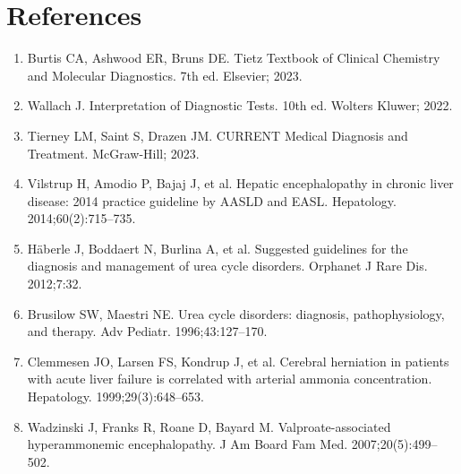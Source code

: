\section*{References}
\begin{enumerate}
  \item Burtis CA, Ashwood ER, Bruns DE. Tietz Textbook of Clinical Chemistry and Molecular Diagnostics. 7th ed. Elsevier; 2023.
  \item Wallach J. Interpretation of Diagnostic Tests. 10th ed. Wolters Kluwer; 2022.
  \item Tierney LM, Saint S, Drazen JM. CURRENT Medical Diagnosis and Treatment. McGraw-Hill; 2023.
  \item Vilstrup H, Amodio P, Bajaj J, et al. Hepatic encephalopathy in chronic liver disease: 2014 practice guideline by AASLD and EASL. Hepatology. 2014;60(2):715--735.
  \item H\"{a}berle J, Boddaert N, Burlina A, et al. Suggested guidelines for the diagnosis and management of urea cycle disorders. Orphanet J Rare Dis. 2012;7:32.
  \item Brusilow SW, Maestri NE. Urea cycle disorders: diagnosis, pathophysiology, and therapy. Adv Pediatr. 1996;43:127--170.
  \item Clemmesen JO, Larsen FS, Kondrup J, et al. Cerebral herniation in patients with acute liver failure is correlated with arterial ammonia concentration. Hepatology. 1999;29(3):648--653.
  \item Wadzinski J, Franks R, Roane D, Bayard M. Valproate-associated hyperammonemic encephalopathy. J Am Board Fam Med. 2007;20(5):499--502.
\end{enumerate}

\clearpage
